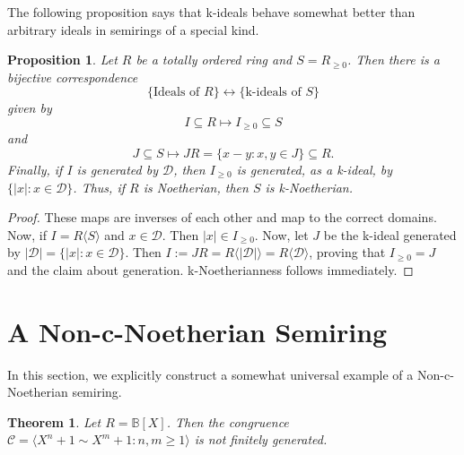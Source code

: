 \documentclass[notitlepage, 10pt]{article}
\theoremstyle{defin}
\theoremstyle{theo}
\newtheorem{thm}[defn]{Theorem}
\newtheorem{prop}[defn]{Proposition}
\theoremstyle{rema}
\newcommand{\bB}{\mathbb{B}}
\newcommand{\cC}{\mathcal{C}}
\newcommand{\cD}{\mathcal{D}}
\begin{document}
 The following proposition says that k-ideals behave somewhat better than arbitrary ideals in semirings of a special kind.

 \begin{prop}
    \label{p:k-ideal}
    Let $R$ be a totally ordered ring and $S=R_{\geq0}$. Then there is a bijective correspondence
    $$\{\text{Ideals of }R\} \longleftrightarrow \{\text{k-ideals of }S\}$$
    given by 
    $$I\subseteq R \mapsto I_{\geq 0}\subseteq S$$
    and
    $$J\subseteq S \mapsto JR = \{x-y : x,y\in J\} \subseteq R.$$   
    Finally, if $I$ is generated by $\cD$, then $I_{\geq 0}$ is generated, as a k-ideal, by $\{|x| :  x\in \cD\}$. Thus, if $R$ is Noetherian, then $S$ is k-Noetherian.
\end{prop}

\begin{proof}
    These maps are inverses of each other and map to the correct domains. Now, if $I = R\langle S\rangle$ and $x\in \cD$. Then $|x|\in I_{\geq 0}$. Now, let $J$ be the k-ideal generated by $|\cD| = \{|x| : x\in \cD\}$. Then $I:=JR= R\langle|\cD|\rangle = R\langle \cD\rangle$, proving that $I_{\geq 0} = J$ and the claim about generation. k-Noetherianness follows immediately.
\end{proof}

\section{A Non-c-Noetherian Semiring}\label{s4}

In this section, we explicitly construct a somewhat universal example of a Non-c-Noetherian semiring.

\begin{thm}\label{thmNc-Noetherian}
    Let $R= \bB[X]$. Then the congruence $\cC=\langle X^n+1\sim X^m+1 : n, m\geq 1\rangle$ is not finitely generated. 
\end{thm}
\end{document}
